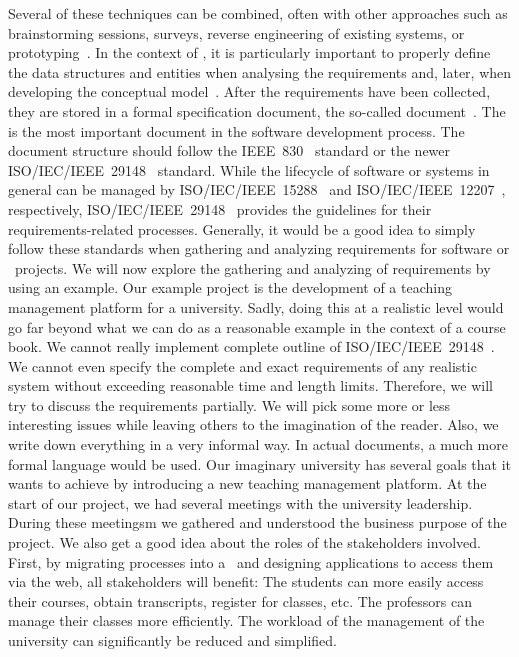 Several of these techniques can be combined, often with other approaches such as brainstorming sessions, surveys, reverse engineering of existing systems, or prototyping~\cite{I2018SAH,S2003ISA6P:RDARS}.
In the context of , it is particularly important to properly define the data structures and entities when analysing the requirements and, later, when developing the conceptual model~\cite{M1987DFADSMFDRACS}.%
%
\endhsection%
%
%
After the requirements have been collected, they are stored in a formal specification document, the so-called  document~\cite{S2010DSRSAR,W2004ASOTMFMTQOTRSD}.
The  is the most important document in the software development process.
The document structure should follow the IEEE~830~\cite{IEEE1998IRPFSRS} standard or the newer ISO/IEC/IEEE~29148~\cite{ISOIECIEEE2018SASELCPRE} standard.
While the lifecycle of software or systems in general can be managed by ISO/IEC/IEEE~15288~\cite{ISOIECIEEE2023SASESLCP} and ISO/IEC/IEEE~12207~\cite{ISOIECIEEE2017SASESLCP}, respectively, ISO/IEC/IEEE~29148~\cite{ISOIECIEEE2018SASELCPRE} provides the guidelines for their requirements-related processes.
Generally, it would be a good idea to simply follow these standards when gathering and analyzing requirements for software or \db\ projects.%
\endhsection%
%
%
%
We will now explore the gathering and analyzing of requirements by using an example.
Our example project is the development of a teaching management platform for a university.
Sadly, doing this at a realistic level would go far beyond what we can do as a reasonable example in the context of a course book.
We cannot really implement complete outline of ISO/IEC/IEEE~29148~\cite{ISOIECIEEE2018SASELCPRE}.
We cannot even specify the complete and exact requirements of any realistic system without exceeding reasonable time and length limits.
Therefore, we will try to discuss the requirements partially.
We will pick some more or less interesting issues while leaving others to the imagination of the reader.
Also, we write down everything in a very informal way.
In actual documents, a much more formal language would be used.%
%
%
%
Our imaginary university has several goals that it wants to achieve by introducing a new teaching management platform.
At the start of our project, we had several meetings with the university leadership.
During these meetingsm we gathered and understood the business purpose of the project.
We also get a good idea about the roles of the stakeholders involved.%
%
%
First, by migrating processes into a \db\ and designing applications to access them via the web, all stakeholders will benefit:
The students can more easily access their courses, obtain transcripts, register for classes, etc.
The professors can manage their classes more efficiently.
The workload of the management of the university can significantly be reduced and simplified.

